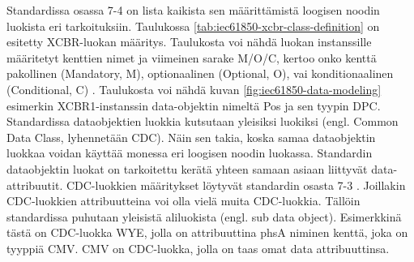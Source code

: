 Standardissa osassa 7-4 on lista kaikista sen määrittämistä loogisen noodin luokista eri tarkoituksiin. Taulukossa \ref{tab:iec61850-xcbr-class-definition} on esitetty XCBR-luokan määritys. Taulukosta voi nähdä luokan instanssille määritetyt kenttien nimet ja viimeinen sarake M/O/C, kertoo onko kenttä pakollinen (Mandatory, M), optionaalinen (Optional, O), vai konditionaalinen (Conditional, C) \cite[s.~106]{IEC61850-7-4}. Taulukosta voi nähdä kuvan \ref{fig:iec61850-data-modeling} esimerkin XCBR1-instanssin data-objektin nimeltä Pos ja sen tyypin DPC. Standardissa dataobjektien luokkia kutsutaan yleisiksi luokiksi (engl. Common Data Class, lyhennetään CDC). Näin sen takia, koska samaa dataobjektin luokkaa voidan käyttää monessa eri loogisen noodin luokassa. Standardin dataobjektin luokat on tarkoitettu kerätä yhteen samaan asiaan liittyvät data-attribuutit. CDC-luokkien määritykset löytyvät standardin osasta 7-3 \cite[s.~26]{IEC61850-1}. Joillakin CDC-luokkien attribuutteina voi olla vielä muita CDC-luokkia. Tällöin standardissa puhutaan yleisistä aliluokista (engl. sub data object). Esimerkkinä tästä on CDC-luokka WYE, jolla on attribuuttina phsA niminen kenttä, joka on tyyppiä CMV. CMV on CDC-luokka, jolla on taas omat data attribuuttinsa. \cite[s.~51,61]{IEC61850-7-2} \cite[s.~36]{IEC61850-7-3}

